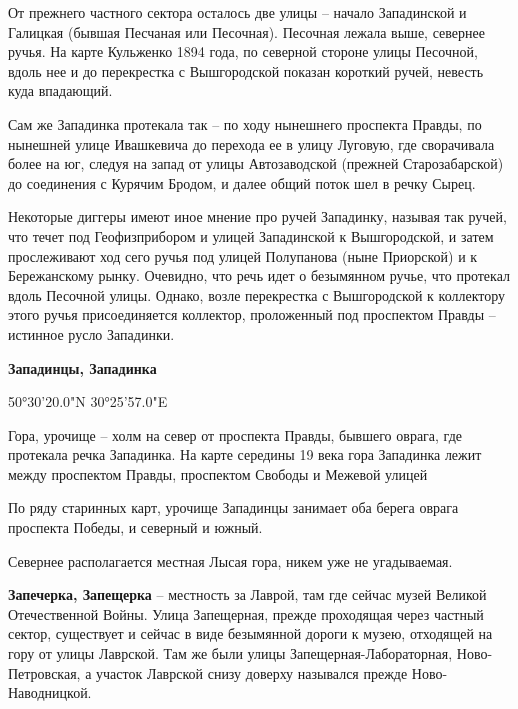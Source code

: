 От прежнего частного сектора осталось две улицы – начало Западинской и Галицкая (бывшая Песчаная или Песочная). Песочная лежала выше, севернее ручья. На карте Кульженко 1894 года, по северной стороне улицы Песочной, вдоль нее и до перекрестка с Вышгородской показан короткий ручей, невесть куда впадающий.

Сам же Западинка протекала так – по ходу нынешнего проспекта Правды, по нынешней улице Ивашкевича до перехода ее в улицу Луговую, где сворачивала более на юг, следуя на запад от улицы Автозаводской (прежней Старозабарской) до соединения с Курячим Бродом, и далее общий поток шел в речку Сырец.

Некоторые диггеры имеют иное мнение про ручей Западинку, называя так ручей, что течет под Геофизприбором и улицей Западинской к Вышгородской, и затем прослеживают ход сего ручья под улицей Полупанова (ныне Приорской) и к Бережанскому рынку. Очевидно, что речь идет о безымянном ручье, что протекал вдоль Песочной улицы. Однако, возле перекрестка с Вышгородской к коллектору этого ручья присоединяется коллектор, проложенный под проспектом Правды – истинное русло Западинки.\\

\medskip

\textbf{Западинцы, Западинка}

50°30'20.0"N 30°25'57.0"E

Гора, урочище – холм на север от проспекта Правды, бывшего оврага, где протекала речка Западинка. На карте середины 19 века гора Западинка лежит между проспектом Правды, проспектом Свободы и Межевой улицей


По ряду старинных карт, урочище Западинцы занимает оба берега оврага проспекта Победы, и северный и южный.

Севернее располагается местная Лысая гора, никем уже не угадываемая.\\

\medskip

\textbf{Запечерка, Запещерка} – местность за Лаврой, там где сейчас музей Великой Отечественной Войны. Улица Запещерная, прежде проходящая через частный сектор, существует и сейчас в виде безымянной дороги к музею, отходящей на гору от улицы Лаврской. Там же были улицы Запещерная-Лабораторная, Ново-Петровская, а участок Лаврской снизу доверху назывался прежде Ново-Наводницкой.


